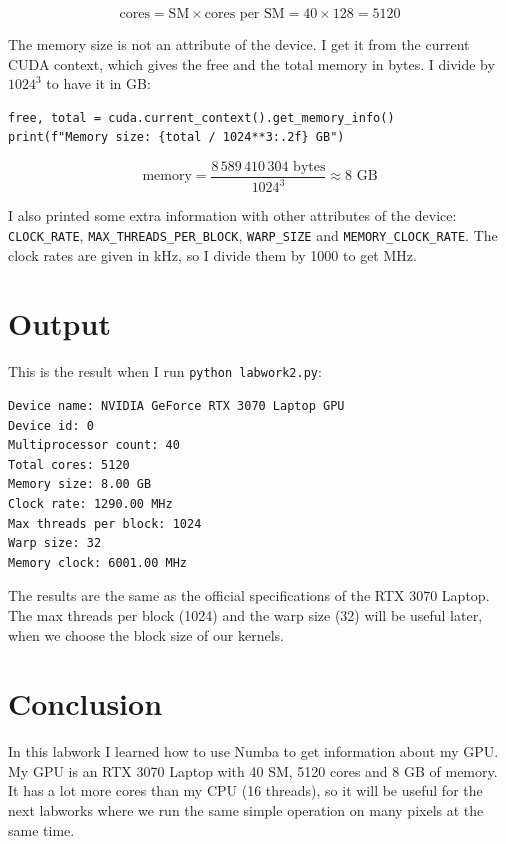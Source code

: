 \documentclass{report}
\begin{document}
\[
\mbox{cores} = \mbox{SM} \times \mbox{cores per SM} = 40 \times 128 = 5120
\]

The memory size is not an attribute of the device. I get it from the current CUDA context,
which gives the free and the total memory in bytes. I divide by $1024^3$ to have it in GB:

\begin{verbatim}
free, total = cuda.current_context().get_memory_info()
print(f"Memory size: {total / 1024**3:.2f} GB")
\end{verbatim}

\[
\mbox{memory} = \frac{8\,589\,410\,304 \mbox{ bytes}}{1024^3} \approx 8 \mbox{ GB}
\]

I also printed some extra information with other attributes of the device:
\texttt{CLOCK\_RATE}, \texttt{MAX\_THREADS\_PER\_BLOCK}, \texttt{WARP\_SIZE} and
\texttt{MEMORY\_CLOCK\_RATE}. The clock rates are given in kHz, so I divide them by 1000 to get MHz.

\section*{Output}

This is the result when I run \texttt{python labwork2.py}:

\begin{verbatim}
Device name: NVIDIA GeForce RTX 3070 Laptop GPU
Device id: 0
Multiprocessor count: 40
Total cores: 5120
Memory size: 8.00 GB
Clock rate: 1290.00 MHz
Max threads per block: 1024
Warp size: 32
Memory clock: 6001.00 MHz
\end{verbatim}

The results are the same as the official specifications of the RTX 3070 Laptop.
The max threads per block (1024) and the warp size (32) will be useful later, when we choose
the block size of our kernels.

\section*{Conclusion}

In this labwork I learned how to use Numba to get information about my GPU.
My GPU is an RTX 3070 Laptop with 40 SM, 5120 cores and 8 GB of memory.
It has a lot more cores than my CPU (16 threads), so it will be useful for the next labworks
where we run the same simple operation on many pixels at the same time.
\end{document}
